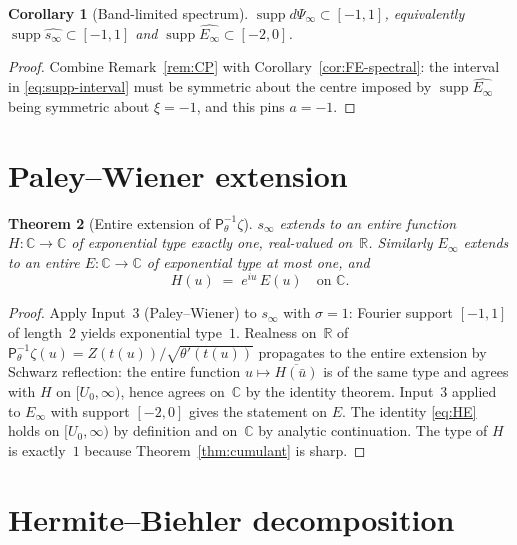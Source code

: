 \documentclass[11pt,a4paper]{article}
\newtheorem{theorem}{Theorem}[section]
\newtheorem{corollary}[theorem]{Corollary}
\theoremstyle{definition}
\DeclareMathOperator{\supp}{supp}
\newcommand{\ipp}{\mathsf{P}_\theta^{-1}}
\newcommand{\C}{\mathbb{C}}
\newcommand{\R}{\mathbb{R}}
\begin{document}
\begin{corollary}[Band-limited spectrum]\label{cor:band}
$\supp d\Psi_\infty \subset [-1,1]$, equivalently
$\supp\widehat{s_\infty}\subset[-1,1]$ and $\supp\widehat{E_\infty}\subset[-2,0]$.
\end{corollary}

\begin{proof}
Combine Remark~\ref{rem:CP} with Corollary~\ref{cor:FE-spectral}: the interval in
\eqref{eq:supp-interval} must be symmetric about the centre imposed by
$\supp\widehat{E_\infty}$ being symmetric about $\xi=-1$, and this pins $a=-1$.
\end{proof}

\section{Paley--Wiener extension}
\label{sec:PW}

\begin{theorem}[Entire extension of $\ipp\zeta$]\label{thm:PW}
$s_\infty$ extends to an entire function $H\colon\C\to\C$ of exponential type
\emph{exactly} one, real-valued on~$\R$. Similarly $E_\infty$ extends to an entire
$E\colon\C\to\C$ of exponential type at most one, and
\begin{equation}
  H(u) \;=\; e^{iu}\,E(u) \quad\text{on } \C.
  \label{eq:HE}
\end{equation}
\end{theorem}

\begin{proof}
Apply Input~3 (Paley--Wiener) to $s_\infty$ with $\sigma=1$: Fourier support
$[-1,1]$ of length~$2$ yields exponential type~$1$. Realness on~$\R$ of
$\ipp\zeta(u) = Z(t(u))/\sqrt{\theta'(t(u))}$ propagates to the entire extension
by Schwarz reflection: the entire function $u\mapsto\overline{H(\bar u)}$ is of the
same type and agrees with $H$ on $[U_0,\infty)$, hence agrees on~$\C$ by the
identity theorem. Input~3 applied to $E_\infty$ with support $[-2,0]$ gives the
statement on $E$. The identity \eqref{eq:HE} holds on $[U_0,\infty)$ by definition
and on~$\C$ by analytic continuation. The type of $H$ is exactly~$1$ because
Theorem~\ref{thm:cumulant} is sharp.
\end{proof}

\section{Hermite--Biehler decomposition}
\label{sec:HB}
\end{document}
